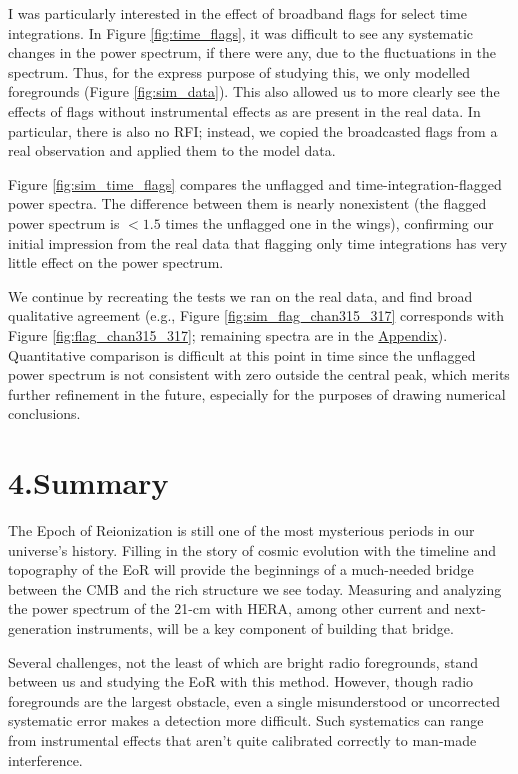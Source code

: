 \documentclass[12pt]{article}
\begin{document}
I was particularly interested in the effect of broadband flags for select time integrations. In Figure \ref{fig:time_flags}, it was difficult to see any systematic changes in the power spectrum, if there were any, due to the fluctuations in the spectrum. Thus, for the express purpose of studying this, we only modelled foregrounds (Figure \ref{fig:sim_data}). This also allowed us to more clearly see the effects of flags without instrumental effects as are present in the real data. In particular, there is also no RFI; instead, we copied the broadcasted flags from a real observation and applied them to the model data.

Figure \ref{fig:sim_time_flags} compares the unflagged and time-integration-flagged power spectra. The difference between them is nearly nonexistent (the flagged power spectrum is $< 1.5$ times the unflagged one in the wings), confirming our initial impression from the real data that flagging only time integrations has very little effect on the power spectrum.

We continue by recreating the tests we ran on the real data, and find broad qualitative agreement (e.g., Figure \ref{fig:sim_flag_chan315_317} corresponds with Figure \ref{fig:flag_chan315_317}; remaining spectra are in the \hyperlink{appendix}{Appendix}). Quantitative comparison is difficult at this point in time since the unflagged power spectrum is not consistent with zero outside the central peak, which merits further refinement in the future, especially for the purposes of drawing numerical conclusions. \vspace{3mm}

\tocless\section{\hypertarget{sec:summary}{4.\hspace{0.75em}Summary}}

The Epoch of Reionization is still one of the most mysterious periods in our universe's history. Filling in the story of cosmic evolution with the timeline and topography of the EoR will provide the beginnings of a much-needed bridge between the CMB and the rich structure we see today. Measuring and analyzing the power spectrum of the 21-cm with HERA, among other current and next-generation instruments, will be a key component of building that bridge.

Several challenges, not the least of which are bright radio foregrounds, stand between us and studying the EoR with this method. However, though radio foregrounds are the largest obstacle, even a single misunderstood or uncorrected systematic error makes a detection more difficult. Such systematics can range from instrumental effects that aren't quite calibrated correctly to man-made interference.
\end{document}
